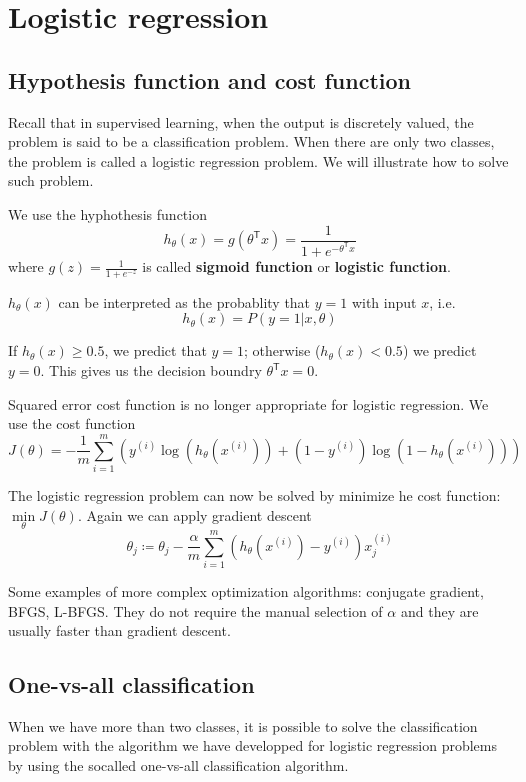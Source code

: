 \ifx\PREAMBLE\undefined


\fi
\section{Logistic regression}
\subsection{Hypothesis function and cost function}
Recall that in supervised learning, when the output is discretely valued, the problem is said to be a classification problem. When there are only two classes, the problem is called a logistic regression problem. We will illustrate how to solve such problem.

We use the hyphothesis function
\begin{equation}
h_{\theta}(x) = g(\theta^{\mathsf T}x) = \frac{1}{1+e^{-\theta^{\mathsf T}x}}
\end{equation}
where $g(z) = \frac{1}{1+e^{-z}}$ is called {\bf sigmoid function} or {\bf logistic function}.

$h_{\theta}(x)$ can be interpreted as the probablity that $y=1$ with input $x$, i.e.
$$h_{\theta}(x) = P(y = 1|x,\theta)$$

If $h_{\theta}(x) \ge 0.5$, we predict that $y=1$; otherwise ($h_{\theta}(x) < 0.5$) we predict $y=0$. This gives us the decision boundry $\theta^{\mathsf T}x=0$. 

Squared error cost function is no longer appropriate for logistic regression. We use the cost function
\begin{equation}
J(\theta) =-\frac{1}{m}\sum\limits_{i=1}^{m}\left(y^{(i)}\log(h_{\theta}(x^{(i)})) + (1-y^{(i)})\log(1-h_{\theta}(x^{(i)}))\right)
\end{equation}

The logistic regression problem can now be solved by minimize he cost function: $\min\limits_{\theta}J(\theta)$. Again we can apply gradient descent
\begin{equation}
\theta_j \coloneqq \theta_j - \frac{\alpha}{m}\sum\limits_{i=1}^{m}\left(h_{\theta}(x^{(i)})-y^{(i)}\right)x_j^{(i)}
\end{equation}

Some examples of more complex optimization algorithms: conjugate gradient, BFGS, L-BFGS. They do not require the manual selection of $\alpha$ and they are usually faster than gradient descent.

\subsection{One-vs-all classification}
When we have more than two classes, it is possible to solve the classification problem with the algorithm we have developped for logistic regression problems by using the socalled one-vs-all classification algorithm.

